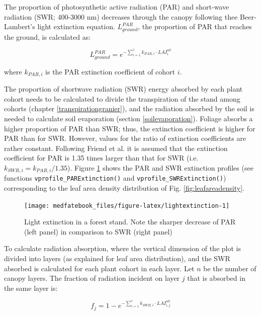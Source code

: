 \documentclass[]{book}
\begin{document}
The proportion of photosynthetic active radiation (PAR) and short-wave
radiation (SWR; 400-3000 nm) decreases through the canopy following thee
Beer-Lambert's light extinction equation. \(L^{PAR}_{ground}\), the
proportion of PAR that reaches the ground, is calculated as:

\begin{equation}
L^{PAR}_{ground}=e^{-\sum_{i=1}^{c}{k_{PAR,i} \cdot LAI_{i}^{all}}}
\end{equation}

where \(k_{PAR,i}\) is the PAR extinction coefficient of cohort \(i\).

The proportion of shortwave radiation (SWR) energy absorbed by each
plant cohort needs to be calculated to divide the transpiration of the
stand among cohorts (chapter \ref{transpirationgranier}), and the
radiation absorbed by the soil is needed to calculate soil evaporation
(section \ref{soilevaporation}). Foliage absorbs a higher proportion of
PAR than SWR; thus, the extinction coefficient is higher for PAR than
for SWR. However, values for the ratio of extinction coefficients are
rather constant. Following Friend et al. \citeyearpar{Friend1997} it is
assumed that the extinction coefficient for PAR is 1.35 times larger
than that for SWR (i.e. \(k_{SWR,i} = k_{PAR,i}/1.35\)). Figure
\ref{fig:lightextinction} shows the PAR and SWR extinction profiles (see
functions \texttt{vprofile\_PARExtinction()} and
\texttt{vprofile\_SWRExtinction()}) corresponding to the leaf area
density distribution of Fig. \ref{fig:leafareadensity}.

\begin{figure}

{\centering \texttt{[image: medfatebook\_files/figure-latex/lightextinction-1]} 

}

\caption{Light extinction in a forest stand. Note the sharper decrease of PAR (left panel) in comparison to SWR (right panel)}\label{fig:lightextinction}
\end{figure}

To calculate radiation absorption, where the vertical dimension of the
plot is divided into layers (as explained for leaf area distribution),
and the SWR absorbed is calculated for each plant cohort in each layer.
Let \(n\) be the number of canopy layers. The fraction of radiation
incident on layer \(j\) that is absorbed in the same layer is:

\begin{equation}
f_j=1 - e^{-\sum_{i=1}^{c}{k_{SWR,i} \cdot LAI_{i,j}^{all}}}
\end{equation}
\end{document}
